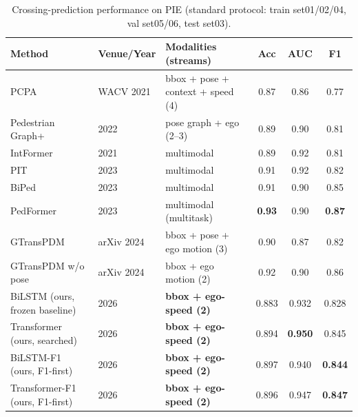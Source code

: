 \begin{table}[H]
\caption{Crossing-prediction performance on PIE (standard protocol: train set01/02/04,
val set05/06, test set03). \label{tab:baselines}}
\begin{tabular}{lllccc}
\toprule
\textbf{Method} & \textbf{Venue/Year} & \textbf{Modalities (streams)} & \textbf{Acc} & \textbf{AUC} & \textbf{F1} \\
\midrule
PCPA \cite{kotseruba2021benchmark} & WACV 2021 & bbox + pose + context + speed (4) & 0.87 & 0.86 & 0.77 \\
Pedestrian Graph+ \cite{cadena2022pedgraph} & 2022 & pose graph + ego (2--3) & 0.89 & 0.90 & 0.81 \\
IntFormer %
 & 2021 & multimodal & 0.89 & 0.92 & 0.81 \\
PIT %
 & 2023 & multimodal & 0.91 & 0.92 & 0.82 \\
BiPed \cite{rasouli2023pedformer} & 2023 & multimodal & 0.91 & 0.90 & 0.85 \\
PedFormer \cite{rasouli2023pedformer} & 2023 & multimodal (multitask) & \textbf{0.93} & 0.90 & \textbf{0.87} \\
GTransPDM \cite{gao2024gtranspdm} & arXiv 2024 & bbox + pose + ego motion (3) & 0.90 & 0.87 & 0.82 \\
GTransPDM w/o pose \cite{gao2024gtranspdm} & arXiv 2024 & bbox + ego motion (2) & 0.92 & 0.90 & 0.86 \\
\midrule
BiLSTM (ours, frozen baseline) & 2026 & \textbf{bbox + ego-speed (2)} & 0.883 & 0.932 & 0.828 \\
Transformer (ours, searched) & 2026 & \textbf{bbox + ego-speed (2)} & 0.894 & \textbf{0.950} & 0.845 \\
BiLSTM-F1 (ours, F1-first) & 2026 & \textbf{bbox + ego-speed (2)} & 0.897 & 0.940 & \textbf{0.844} \\
Transformer-F1 (ours, F1-first) & 2026 & \textbf{bbox + ego-speed (2)} & 0.896 & 0.947 & \textbf{0.847} \\
\bottomrule
\end{tabular}

\end{table}
